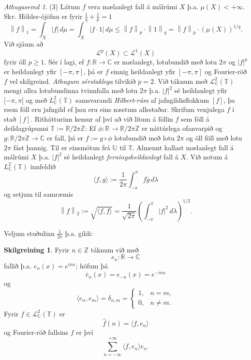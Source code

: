 \documentclass[a4paper,icelandic,11pt]{book}
\theoremstyle{plain}      \newtheorem{setn}{Setning}[chapter]
\theoremstyle{definition} \newtheorem{skilgr}[setn]{Skilgreining}
\theoremstyle{remark}     \newtheorem*{ath}{Athugasemd}
\newcommand{\R}{\mathbb R}
\newcommand{\C}{\mathbb C}
\newcommand{\Z}{\mathbb Z}
\begin{document}
\begin{ath}
  (3) Látum $f$ vera mælanlegt fall á málrúmi $X$
  þ.a. $\mu(X)<+\infty$. Skv. Hölder-ójöfnu er fyrir
  $\frac{1}{q}+\frac{1}{p} = 1$ 
  \[
  \left\|
    f
  \right\|_{1}
  = \int_{X}^{}|f|\,d\mu
  = \int_{X}^{}\left|
    f\cdot 1
  \right|\,d\mu
  \le \left\|
    f
  \right\|_{p}
  \cdot \left\|
    1
  \right\|_{q}
  = \left\|
    f
  \right\|_{p}
  \cdot (\mu(X))^{1/q}.
  \]
  Við sjáum að 
  \[
  \mathcal L^{p}(X) \subset\mathcal L^{1}(X)
  \]
  fyrir öll $p\ge 1$. Sér í lagi, ef $f:\R\to\C$ er mælanlegt,
  lotubundið með lotu $2\pi$ og $|f|^{p}$ er heildanlegt yfir
  $[-\pi,\pi]$, þá er $f$ einnig heildanlegt yfir $[-\pi,\pi]$ og
  Fourier-röð $f$ vel skilgreind. \emph{Athugum sérstaklega} tilvikið
  $p=2$. Við táknum með $\mathcal L_{\C}^{2}(\mathbb T)$ mengi allra
  lotubundinna tvinnfalla með lotu $2\pi$ þ.a. $|f|^{2}$ sé
  heildanlegt yfir $[-\pi,\pi[$ og með $L_{\C}^{2}(\mathbb T)$
  samsvarandi \emph{Hilbert-rúm} af
  jafngildisflokkum $[f]$, þa rsem föll eru jafngild ef þau eru eins
  næstum allsstaðar. Skrifum venjulega $f$ í stað $[f]$. Rithátturinn
  kemur af því að við lítum á föllin $f$ sem föll á deildagrúpunni
  $\mathbb T:=\R/2\pi\Z$: Ef $\phi:\R\to\R/2\pi\Z$ er náttúrlega
  ofanvarpið og $g:\R/2\pi\Z\to\C$ er fall, þá er $f:=g\circ\phi$
  lotubundið með lotu $2\pi$ og öll föll með lotu $2\pi$ fást
  þannig. Til er einsmótun frá $\mathbb U$ til $\mathbb T$. Almennt
  kallast mælanlegt fall á málrúmi $X$ þ.a. $|f|^{2}$ sé heildanlegt
  \emph{ferningsheildanlegt} fall á
  $X$. Við notum á $L_{\C}^{2}(\mathbb T)$ innfeldið 
  \[
  \langle f, g \rangle
  := \frac{1}{2\pi}\int_{-\pi}^{\pi}f\bar g\,d\lambda
  \]
  og setjum til samræmis 
  \[
  \left\|
    f
  \right\|_{2}
  := \sqrt{\langle f,f\rangle}
  = \frac{1}{\sqrt{2\pi}}\left(
    \int_{-\pi}^{\pi}\left|
      f
    \right|^{2}\,d\lambda
  \right)^{1/2}.
  \]
\end{ath}
Veljum stuðulinn $\frac{1}{2\pi}$ þ.a. gildi: 
\begin{skilgr}
  Fyrir $n\in\Z$ táknum við með 
  \[
  e_{n}:\R\to\C
  \]
  fallið þ.a. $e_{n}(x) = e^{inx}$; höfum þá 
  \[
  \bar e_{n}(x) = e_{-n}(x) = e^{-inx}
  \]
  og 
  \[
  \langle e_{n}, e_{m}\rangle
  = \delta_{n,m}
  = 
  \begin{cases}
    1, & n = m,\\
    0, & n\ne m.
  \end{cases}
  \]
  Fyrir $f\in\mathcal L_{\C}^{2}(\mathbb T)$ er 
  \[
  \hat f(n) = \langle f,e_{n}\rangle
  \]
  og Fourier-röð fallsins $f$ er því
  \[
  \sum_{n=-\infty}^{+\infty}\langle f,e_{n}\rangle e_{n}.
  \]
\end{skilgr}
\end{document}
